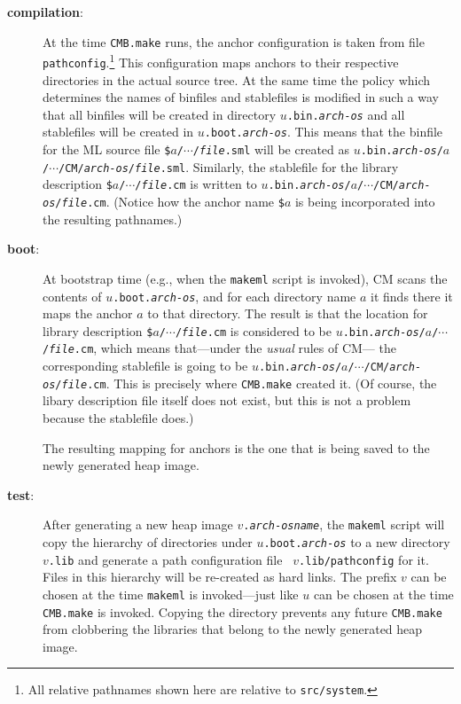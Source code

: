 \begin{description}
\item[{\bf compilation}:]
At the time {\tt CMB.make} runs, the anchor configuration is taken
from file {\tt pathconfig}.\footnote{All relative pathnames shown here
are relative to {\tt src/system}.}  This configuration maps anchors to
their respective directories in the actual source tree.  At the same
time the policy which determines the names of binfiles
and stablefiles is modified in such a way that all binfiles will be
created in directory {\tt $u$.bin.{\it arch}-{\it os}} and all
stablefiles will be created in {\tt $u$.boot.{\it arch}-{\it os}}.
This means that the binfile for the ML source file
{\tt \$$a$/$\cdots$/{\it file}.sml}
will be created as
{\tt $u$.bin.{\it arch}-{\it os}/$a$/$\cdots$/CM/{\it arch}-{\it os}/{\it file}.sml}.
Similarly, the stablefile for the library description
{\tt \$$a$/$\cdots$/{\it file}.cm}
is written to
{\tt $u$.bin.{\it arch}-{\it os}/$a$/$\cdots$/CM/{\it arch}-{\it os}/{\it file}.cm}.
(Notice how the anchor name {\tt \$$a$} is being incorporated into the
resulting pathnames.)
\item[{\bf boot}:]
At bootstrap time (e.g., when the {\tt makeml} script is invoked), CM
scans the contents of {\tt $u$.boot.{\it arch}-{\it os}}, and for
each directory name $a$ it finds there it maps the anchor $a$ to that
directory.  The result is that the location for library description
{\tt \$$a$/$\cdots$/{\it file}.cm}
is considered to be
{\tt $u$.bin.{\it arch}-{\it os}/$a$/$\cdots$/{\it file}.cm}, which
means that---under the {\em usual} rules of CM---
the corresponding stablefile is going to be
{\tt $u$.bin.{\it arch}-{\it os}/$a$/$\cdots$/CM/{\it arch}-{\it
os}/{\it file}.cm}.  This is precisely where {\tt CMB.make} created
it.  (Of course, the libary description file itself does not exist,
but this is not a problem because the stablefile does.)

The resulting mapping for anchors is the one that is being saved to the
newly generated heap image.
\item[{\bf test}:]
After generating a new heap image {\tt $v$.{\it arch}-{\it osname}},
the {\tt makeml} script will copy the hierarchy of directories under
{\tt $u$.boot.{\it arch}-{\it os}} to a new directory {\tt $v$.lib}
and generate a path configuration file {\tt
$v$.lib/pathconfig} for it.  Files in this hierarchy will be re-created as
hard links.  The prefix $v$ can be chosen at the time {\tt makeml} is
invoked---just like $u$ can be chosen at the time {\tt CMB.make} is
invoked.  Copying the directory prevents any future {\tt CMB.make}
from clobbering the libraries that belong to the newly generated heap
image.


\end{description}
